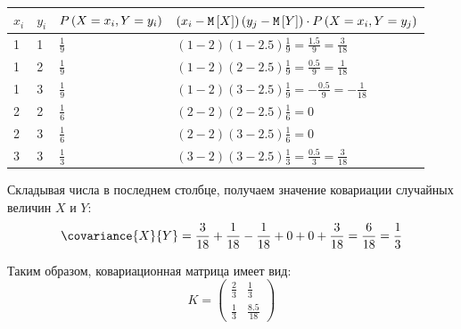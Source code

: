 \documentclass[12pt,a4paper]{article}
\begin{document}
\begin{enumerate}
        \begin{tabular}{|p{1cm}|p{1cm}|p{4cm}|p{8cm}|}
            \hline
            $x_i$ & $y_i$ & $P \left ( X=x_i, Y=y_i \right )$ & $\left ( x_i - \mathtt{M} \left [ X \right ] \right ) \left ( y_j - \mathtt{M} \left [ Y \right ] \right ) \cdot P \left ( X=x_i, Y=y_j \right )$ \\
            \hline
            1     & 1     & $\frac{1}{9}$                & $( 1 - 2 ) ( 1 - 2.5 ) \frac{1}{9} = \frac{1.5}{9} = \frac{3}{18}$                                               \\
            \hline
            1     & 2     & $\frac{1}{9}$                & $( 1 - 2 ) ( 2 - 2.5 ) \frac{1}{9} = \frac{0.5}{9} = \frac{1}{18}$                                               \\
            \hline
            1     & 3     & $\frac{1}{9}$                & $( 1 - 2 ) ( 3 - 2.5 ) \frac{1}{9} = -\frac{0.5}{9} = - \frac{1}{18}$                                            \\
            \hline
            2     & 2     & $\frac{1}{6}$                & $( 2 - 2 ) ( 2 - 2.5 ) \frac{1}{6} = 0$                                                                          \\
            \hline
            2     & 3     & $\frac{1}{6}$                & $( 2 - 2 ) ( 3 - 2.5 ) \frac{1}{6} = 0$                                                                          \\
            \hline
            3     & 3     & $\frac{1}{3}$                & $( 3 - 2 ) ( 3 - 2.5 ) \frac{1}{3} = \frac{0.5}{3} = \frac{3}{18}$                                               \\
            \hline
        \end{tabular}

        Складывая числа в последнем столбце, получаем значение ковариации случайных величин $X$ и $Y$:
        \begin{equation}
            \covariance{X}{Y} = \frac{3}{18} + \frac{1}{18} - \frac{1}{18} + 0 + 0 + \frac{3}{18} = \frac{6}{18} = \frac{1}{3}
        \end{equation}

        Таким образом, ковариационная матрица имеет вид:
        \begin{equation}
            K =
            \begin{pmatrix}
                \frac{2}{3} & \frac{1}{3}    \\
                \frac{1}{3} & \frac{8.5}{18}
            \end{pmatrix}
        \end{equation}


\end{enumerate}
\end{document}
